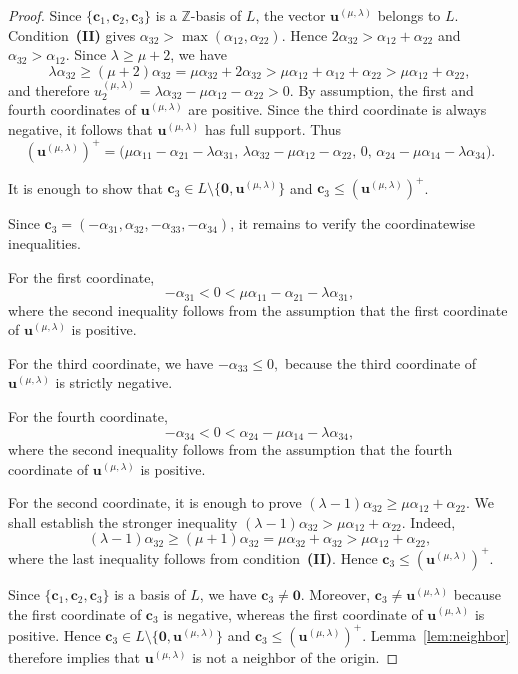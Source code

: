 \documentclass[12pt,a4paper]{amsart}
\theoremstyle{definition}
\begin{document}
\begin{proof}
Since $\{\mathbf c_1,\mathbf c_2,\mathbf c_3\}$ is a $\mathbb Z$-basis
of $L$, the vector $\mathbf u^{(\mu,\lambda)}$ belongs to $L$. Condition~\textup{\textbf{(II)}} gives
$\alpha_{32}>\max(\alpha_{12},\alpha_{22})$.
Hence
$2\alpha_{32}>\alpha_{12}+\alpha_{22}$ and
$\alpha_{32}>\alpha_{12}$.
Since $\lambda\ge\mu+2$, we have
\[
\lambda\alpha_{32}
\ge
(\mu+2)\alpha_{32}
=
\mu\alpha_{32}+2\alpha_{32}
>
\mu\alpha_{12}+\alpha_{12}+\alpha_{22}
>
\mu\alpha_{12}+\alpha_{22},
\]
and therefore
$
u^{(\mu,\lambda)}_2
=
\lambda\alpha_{32}
-\mu\alpha_{12}
-\alpha_{22}
>0.
$
By assumption, the first and fourth coordinates of
$\mathbf u^{(\mu,\lambda)}$ are positive. Since the third coordinate is
always negative, it follows that $\mathbf u^{(\mu,\lambda)}$ has full
support. Thus
\[
(\mathbf u^{(\mu,\lambda)})^+
=
\bigl(
\mu\alpha_{11}-\alpha_{21}-\lambda\alpha_{31},
\,
\lambda\alpha_{32}-\mu\alpha_{12}-\alpha_{22},
\,
0,
\,
\alpha_{24}-\mu\alpha_{14}-\lambda\alpha_{34}
\bigr).
\]

It is enough to show that
$\mathbf c_3\in L\setminus\{\mathbf0,\mathbf u^{(\mu,\lambda)}\}$ and
$\mathbf c_3\le(\mathbf u^{(\mu,\lambda)})^+$.

Since
$\mathbf c_3
=
(-\alpha_{31},
\alpha_{32},
-\alpha_{33},
-\alpha_{34})$,
it remains to verify the coordinatewise inequalities.

For the first coordinate,
\[
-\alpha_{31}
<
0
<
\mu\alpha_{11}-\alpha_{21}-\lambda\alpha_{31},
\]
where the second inequality follows from the assumption that the first
coordinate of $\mathbf u^{(\mu,\lambda)}$ is positive.

For the third coordinate, we have
$
-\alpha_{33}
\le
0,$
because the third coordinate of $\mathbf u^{(\mu,\lambda)}$ is
strictly negative.

For the fourth coordinate,
\[
-\alpha_{34}
<
0
<
\alpha_{24}-\mu\alpha_{14}-\lambda\alpha_{34},
\]
where the second inequality follows from the assumption that the fourth
coordinate of $\mathbf u^{(\mu,\lambda)}$ is positive.

For the second coordinate, it is enough to prove
$
(\lambda-1)\alpha_{32}
\ge
\mu\alpha_{12}
+\alpha_{22}.
$
We shall establish the stronger inequality
$
(\lambda-1)\alpha_{32}
>
\mu\alpha_{12}
+\alpha_{22}.
$
Indeed,
\[
(\lambda-1)\alpha_{32}
\ge
(\mu+1)\alpha_{32}
=
\mu\alpha_{32}
+\alpha_{32}
>
\mu\alpha_{12}
+\alpha_{22},
\]
where the last inequality follows from
condition~\textup{\textbf{(II)}}.
Hence
$\mathbf c_3\le(\mathbf u^{(\mu,\lambda)})^+$.

Since
$\{\mathbf c_1,\mathbf c_2,\mathbf c_3\}$ is a basis of $L$,
we have $\mathbf c_3\neq\mathbf0$.
Moreover,
$\mathbf c_3\neq\mathbf u^{(\mu,\lambda)}$
because the first coordinate of $\mathbf c_3$ is negative,
whereas the first coordinate of
$\mathbf u^{(\mu,\lambda)}$ is positive.
Hence
$
\mathbf c_3
\in
L\setminus\{\mathbf0,\mathbf u^{(\mu,\lambda)}\}$ and
$\mathbf c_3
\le
(\mathbf u^{(\mu,\lambda)})^+.$ Lemma~\ref{lem:neighbor} therefore implies that
$\mathbf u^{(\mu,\lambda)}$
is not a neighbor of the origin.
\end{proof}
\end{document}
